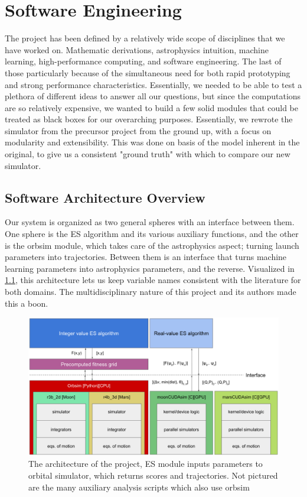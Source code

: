 
\chapter{Software Engineering}

The project has been defined by a relatively wide scope of disciplines that we have worked on. Mathematic derivations, astrophysics intuition, machine learning, high-performance computing, and software engineering. The last of those particularly because of the simultaneous need for both rapid prototyping and strong performance characteristics. Essentially, we needed to be able to test a plethora of different ideas to answer all our questions, but since the computations are so relatively expensive, we wanted to build a few solid modules that could be treated as black boxes for our overarching purposes. Essentially, we rewrote the simulator from the precursor project \cite{Saxe2015} from the ground up, with a focus on modularity and extensibility. This was done on basis of the model inherent in the original, to give us a consistent "ground truth" with which to compare our new simulator.


\section{Software Architecture Overview}
Our system is organized as two general spheres with an interface between them. One sphere is the ES algorithm and its various auxiliary functions, and the other is the orbsim module, which takes care of the astrophysics aspect; turning launch parameters into trajectories. Between them is an interface that turns machine learning parameters into astrophysics parameters, and the reverse. Visualized in \cref{fig:software_architecture}, this architecture lets us keep variable names consistent with the literature for both domains. The multidisciplinary nature of this project and its authors made this a boon.

\begin{figure}
    \centering
    \includegraphics[width=\linewidth]{fig/software_architecture}
    \caption{The architecture of the project, ES module inputs parameters to orbital simulator, which returns scores and trajectories. Not pictured are the many auxiliary analysis scripts which also use orbsim}
    \label{fig:software_architecture}
\end{figure}

